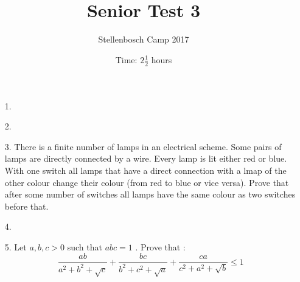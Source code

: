 \documentclass[12pt]{article}
\title{Senior Test 3}
\author{Stellenbosch Camp 2017}
\date{Time: $2\frac{1}{2}$ hours}
\begin{document}
 \maketitle

\begin{enumerate}

\item[1.] %


\item[2.] %


\item[3.] %
There is a finite number of lamps in an electrical scheme. Some pairs of lamps are directly connected by a wire. Every lamp is lit either red or blue. With one switch all lamps that have a direct connection with a lmap of the other colour change their colour (from red to blue or vice versa). Prove that after some number of switches all lamps have the same colour as two switches before that.


\item[4.] %


\item[5.] %
Let $ a,b,c > 0$ such that $ abc = 1$ . Prove that :
    $$ \frac {ab}{a^2 + b^2 + \sqrt {c}} + \frac {bc}{b^2 + c^2 + \sqrt {a}} + \frac {ca}{c^2 + a^2 + \sqrt {b}}\le 1 $$


\end{enumerate}
\end{document}
